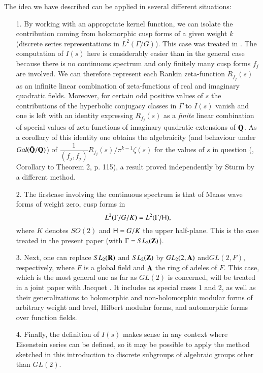 The idea we have described can be applied in several different situations:
\begin{itemize}
\item[1.] By working with an appropriate kernel function, we can isolate the contribution coming from holomorphic cusp forms of a given weight $k$ (discrete series representations in $L^2 (\Gamma / G)$). This case was treated in \cite{art11-10}. The computation of $I(s)$ here is considerably easier than in the general case because there is no continuous spectrum and only finitely many cusp forms $f_j$ are involved. We can therefore represent each Rankin zeta-function $R_{f_j}(s)$ as an infinite linear combination of zeta-functions of real and imaginary quadratic fields. Moreover, for certain odd positive values of $s$ the contributions of the hyperbolic conjugacy classes in $\Gamma$ to $I(s)$ vanish and one is left with an identity expressing $R_{f_j}(s)$ as a \textit{finite} linear combination of special values of zeta-functions of imaginary quadratic extensions of $\mathbf{Q}$. As a corollary of this identity one obtains the algebraicity (and behaviour under $Gal (\bar{\mathbf{Q}}/\mathbf{Q})$) of $\dfrac{1}{(f_j, f_j)}R_{f_j} (s)/ \pi^{k-1} \zeta(s)$ for the values of $s$ in question (\cite{art11-10}, Corollary to Theorem 2, p. 115), a result proved independently by Sturm \cite{art11-9} by a different method.

\item[2.] The first\pageoriginale case involving the continuous spectrum is that of Maass wave forms of weight zero, \ie cusp forms in 
$$
L^2 (\Gamma / G / K) = L^2 (\Gamma / \mathsf{H}),
$$ 
where $K$ denotes $SO(2)$ and $\mathsf{H} = G/ K$ the upper half-plane. This is the case treated in the present paper (with $\Gamma = SL_2 (\mathbf{Z})$).
 
\item[3.] Next, one can replace $SL_2 (\mathbf{R})$ and $SL_2 (\mathbf{Z})$ by $GL_2 (2, \mathbf{A})$ and\break $GL (2, F)$, respectively, where $F$ is a global field and $\mathbf{A}$ the ring of adeles of $F$. This case, which is the most general one as far as $GL(2)$ is concerned, will be treated in a joint paper with Jacquet \cite{art11-3}. It includes as special cases 1 and 2, as well as their generalizations to holomorphic and non-holomorphic modular forms of arbitrary weight and level, Hilbert modular  forms, and automorphic forms over function fields.
 
\item[4.] Finally, the definition of $I(s)$ makes sense in any context where Eisenstein series can be defined, so it may be possible to apply the method sketched in this introduction to discrete subgroups of algebraic groups other than $GL(2)$.
\end{itemize}

